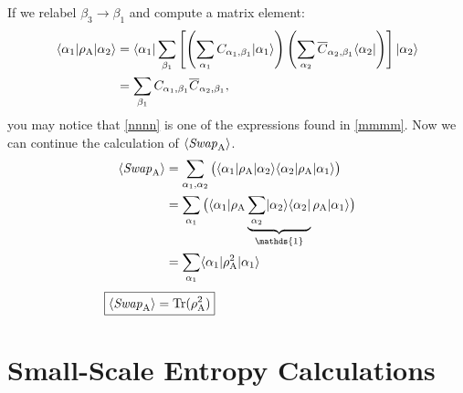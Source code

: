 If we relabel $\beta_3 \rightarrow \beta_1$ and compute a matrix element:
\begin{align}
	\langle {\alpha_1} \rvert\rho_{\rm A} \lvert {\alpha_2} \rangle
	&=   \langle {\alpha_1} \rvert\sum_{\beta_1}  \left[ \left(\sum_{\alpha_1} 
		C_{\alpha_1,\beta_1}\lvert {\alpha_1} \rangle\right)
		\left(\sum_{\alpha_2} 
		\overline{C}_{\alpha_2,\beta_1}\langle {\alpha_2} \rvert\right) \right] \lvert {\alpha_2} \rangle \\
	&= \sum_{\beta_1} C_{\alpha_1,\beta_1} \overline{C}_{\alpha_2,\beta_1} \label{nnnn},
\end{align}
you may notice that \eqref{nnnn} is one of the expressions found in \eqref{mmmm}.
Now we can continue the calculation of $\langle {\it Swap}_{\rm A} \rangle$.
\begin{align}
\langle \SWA \rangle &= \sum_{\alpha_1,\alpha_2} \big( \bra{\alpha_1}\rho_{\rm A} \ket{\alpha_2} 
					\bra{\alpha_2}\rho_{\rm A} \ket{\alpha_1}\big) \\
	&= \sum_{\alpha_1} \big( \bra{\alpha_1}\rho_{\rm A} 
				\underbrace{\sum_{\alpha_2} \ket{\alpha_2}\bra{\alpha_2}}_{\mathds{1}}
				\rho_{\rm A} \ket{\alpha_1}\big) \\
	&= \sum_{\alpha_1} \bra{\alpha_1}\rho_{\rm A}^2  \ket{\alpha_1}
\end{align}
\vspace{-5mm}
\begin{align}
	\hspace{-3.3cm}\boxed{\langle \SWA \rangle= {\rm Tr (\rho_A^2)}} \hspace{1cm}
\end{align}

\chapter{Small-Scale Entropy Calculations}
\label{small}
\newcommand{\ra}{\rangle}
\newcommand{\la}{\langle}
\newcommand{\ox}{\otimes}
\newcommand{\singlet}[2]{\left( \mid \up_#1 \dw_#2 \ra - \mid \dw_#1 \up_#2 \ra \right) }
\newcommand{\kb}[2]{\mid \! #1 \ra \la #2 \!\mid}

